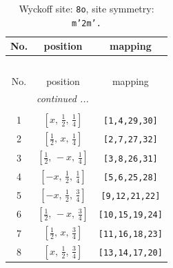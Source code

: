 \documentclass[fleqn,8pt]{jsarticle}
\begin{document}
\begin{longtable}{ccc}
\caption{Wyckoff site: {\tt 8o}, site symmetry: {\tt m'2m'.}}
 \\
 \hline \hline
No. & position & mapping \\ \hline \endfirsthead

\multicolumn{2}{l}{\tablename\ \thetable{}} \\
 \hline \hline
No. & position & mapping \\ \hline \endhead

 \hline \hline
\multicolumn{2}{r}{\footnotesize\it continued ...} \\ \endfoot

 \hline \hline
\multicolumn{2}{r}{} \\ \endlastfoot

1 & $\left[ x,\, \frac{1}{2},\, \frac{1}{4} \right]$ & {\tt [1,4,29,30]} \\ \hline
2 & $\left[ \frac{1}{2},\, x,\, \frac{1}{4} \right]$ & {\tt [2,7,27,32]} \\ \hline
3 & $\left[ \frac{1}{2},\, - x,\, \frac{1}{4} \right]$ & {\tt [3,8,26,31]} \\ \hline
4 & $\left[ - x,\, \frac{1}{2},\, \frac{1}{4} \right]$ & {\tt [5,6,25,28]} \\ \hline
5 & $\left[ - x,\, \frac{1}{2},\, \frac{3}{4} \right]$ & {\tt [9,12,21,22]} \\ \hline
6 & $\left[ \frac{1}{2},\, - x,\, \frac{3}{4} \right]$ & {\tt [10,15,19,24]} \\ \hline
7 & $\left[ \frac{1}{2},\, x,\, \frac{3}{4} \right]$ & {\tt [11,16,18,23]} \\ \hline
8 & $\left[ x,\, \frac{1}{2},\, \frac{3}{4} \right]$ & {\tt [13,14,17,20]} \\
\end{longtable}
\renewcommand{\arraystretch}{1.2}
\end{document}
